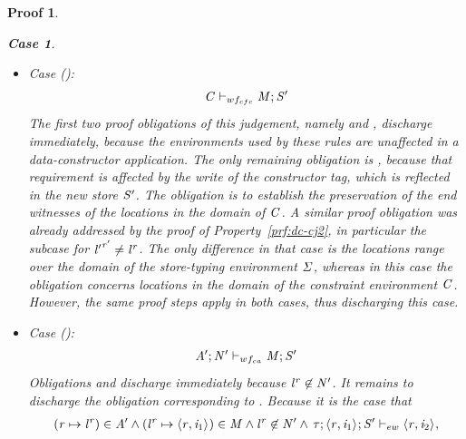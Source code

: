 \documentclass[showabstract,showacknowledgments,showpreface,showdedication]{iuphd}
\newtheorem*{bcase}{Case}
\theoremstyle{nonumberplain}
\newtheorem{nproof}{Proof}
\begin{document}
\begin{nproof}
\begin{bcase}
\begin{itemize}
\begin{itemize}
\begin{itemize}
      thus discharging this case.
      \end{itemize}
      \item Case ():
      \begin{align*}
      \mathit{C} \vdash_{wf_{cfc}} \mathit{M};\mathit{S}'
      \end{align*}
      The first two proof obligations of this judgement, namely  and , discharge immediately, because the environments used by these
      rules are unaffected in a data-constructor application.
      The only remaining obligation is , because that requirement is affected by the write of the constructor tag, which is reflected in the new store $\mathit{S}'$.
      The obligation is to establish the preservation of the
      end witnesses of the locations in the domain of $\mathit{C}$.
      A similar proof obligation was already addressed by the proof of Property~\ref{prf:dc-cj2},
      in particular the subcase for ${\mathit{l}'}^{\mathit{r}'} \neq {\mathit{l}}^{\mathit{r}}$.
      The only difference in that case is the locations range over the
      domain of the store-typing environment $\mathit{\Sigma}$, whereas in this case
      the obligation concerns locations
      in the domain of the constraint environment $\mathit{C}$.
      However, the same proof steps apply in both cases, thus discharging
      this case.
      \item Case ():
      \begin{align*}
      \mathit{A}';\mathit{N}' \vdash_{wf_{ca}} \mathit{M};\mathit{S}'
      \end{align*}
      Obligations  and
       discharge immediately
      because ${\mathit{l}}^{\mathit{r}} \not \in \mathit{N}'$.
      It remains to discharge the obligation corresponding to
      .
      Because it is the case that
      \begin{align*}
      (\reg \mapsto \locreg{\loc}{\reg}) \in \AENV' \wedge 
      (\locreg{\loc}{\reg} \mapsto \concreteloc{\reg}{\ind_1}{}) \in \MENV \wedge \locreg{\loc}{\reg} \not \in \NENV' \wedge
    \, \ewitness{\TYP}{\concreteloc{\reg}{\ind_1}{}}{\STOR'}{\concreteloc{\reg}{\ind_2}{}},

\end{align*}
\end{itemize}
\end{itemize}
\end{bcase}
\end{nproof}
\end{document}
